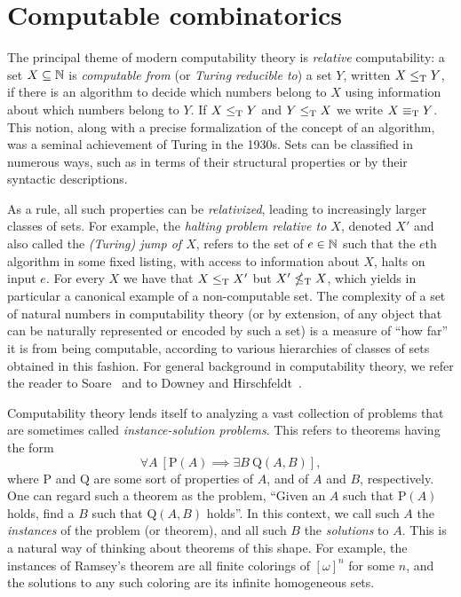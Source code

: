 \section{Computable combinatorics}

The principal theme of modern computability theory is \emph{relative} computability: a set $X \subseteq \mathbb{N}$ is \emph{computable from} (or \emph{Turing reducible to}) a set $Y$, written $X \leq_{\text{\upshape T}} Y$, if there is an algorithm to decide which numbers belong to $X$ using information about which numbers belong to $Y$. If $X \leq_{\text{\upshape T}} Y$ and $Y \leq_{\text{\upshape T}} X$ we write $X \equiv_{\text{\upshape T}} Y$. This notion, along with a precise formalization of the concept of an algorithm, was a seminal achievement of Turing in the 1930s. Sets can be classified in numerous ways, such as in terms of their structural properties or by their syntactic descriptions.

As a rule, all such properties can be \emph{relativized}, leading to increasingly larger classes of sets. For example, the \emph{halting problem relative to $X$}, denoted $X'$ and also called the \emph{(Turing) jump of $X$}, refers to the set of $e \in \mathbb{N}$ such that the $e$th algorithm in some fixed listing, with access to information about $X$, halts on input $e$. For every $X$ we have that $X \leq_{\text{\upshape T}} X'$ but $X' \nleq_{\text{\upshape T}} X$, which yields in particular a canonical example of a non-computable set. The complexity of a set of natural numbers in computability theory (or by extension, of any object that can be naturally represented or encoded by such a set) is a measure of ``how far'' it is from being computable, according to various hierarchies of classes of sets obtained in this fashion. For general background in computability theory, we refer the reader to Soare~\cite{Soare2016Turing} and to Downey and Hirschfeldt~\cite{Downey2010Algorithmic}.

Computability theory lends itself to analyzing a vast collection of problems that are sometimes called \emph{instance-solution problems}. This refers to theorems having the form
\begin{equation}\label{eqn:Pi12}
	\forall A~[\mathrm{P}(A) \implies \exists B~\mathrm{Q}(A,B)],
\end{equation}
where $\mathrm{P}$ and $\mathrm{Q}$ are some sort of properties of $A$, and of $A$ and $B$, respectively. One can regard such a theorem as the problem, ``Given an $A$ such that $\mathrm{P}(A)$ holds, find a $B$ such that $\mathrm{Q}(A,B)$ holds''. In this context, we call such $A$ the \emph{instances} of the problem (or theorem), and all such $B$ the \emph{solutions} to $A$. This is a natural way of thinking about theorems of this shape. For example, the instances of Ramsey's theorem are all finite colorings of $[\omega]^n$ for some $n$, and the solutions to any such coloring are its infinite homogeneous sets.

